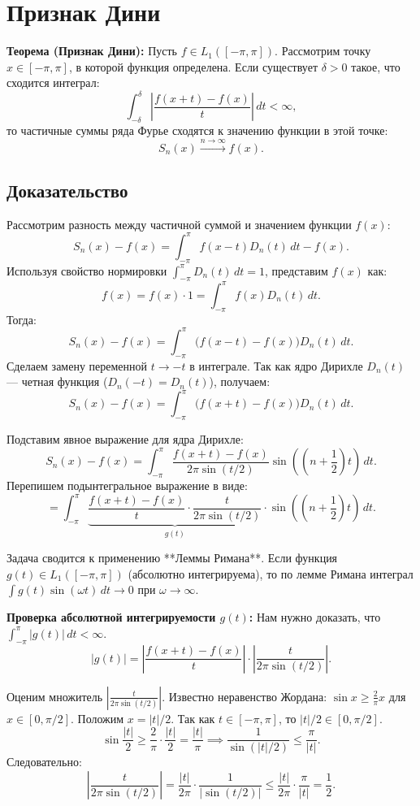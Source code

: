 \documentclass[12pt,a4paper,openany]{book}
\begin{document}
\section{Признак Дини}

\textbf{Теорема (Признак Дини):}
Пусть $f \in L_1([-\pi, \pi])$.
Рассмотрим точку $x \in [-\pi, \pi]$, в которой функция определена.
Если существует $\delta > 0$ такое, что сходится интеграл:
$$ \int_{-\delta}^{\delta} \left| \frac{f(x+t) - f(x)}{t} \right| \, dt < \infty, $$
то частичные суммы ряда Фурье сходятся к значению функции в этой точке:
$$ S_n(x) \xrightarrow{n \to \infty} f(x). $$

\subsection{Доказательство}

Рассмотрим разность между частичной суммой и значением функции $f(x)$:
$$ S_n(x) - f(x) = \int_{-\pi}^{\pi} f(x-t) D_n(t) \, dt - f(x). $$
Используя свойство нормировки $\int_{-\pi}^{\pi} D_n(t) \, dt = 1$, представим $f(x)$ как:
$$ f(x) = f(x) \cdot 1 = \int_{-\pi}^{\pi} f(x) D_n(t) \, dt. $$
Тогда:
$$ S_n(x) - f(x) = \int_{-\pi}^{\pi} \big( f(x-t) - f(x) \big) D_n(t) \, dt. $$
Сделаем замену переменной $t \to -t$ в интеграле. Так как ядро Дирихле $D_n(t)$ — четная функция ($D_n(-t) = D_n(t)$), получаем:
$$ S_n(x) - f(x) = \int_{-\pi}^{\pi} \big( f(x+t) - f(x) \big) D_n(t) \, dt. $$

Подставим явное выражение для ядра Дирихле:
$$ S_n(x) - f(x) = \int_{-\pi}^{\pi} \frac{f(x+t) - f(x)}{2\pi \sin(t/2)} \sin\left(\left(n + \frac{1}{2}\right)t\right) \, dt. $$
Перепишем подынтегральное выражение в виде:
$$ = \int_{-\pi}^{\pi} \underbrace{\frac{f(x+t) - f(x)}{t} \cdot \frac{t}{2\pi \sin(t/2)}}_{g(t)} \cdot \sin\left(\left(n + \frac{1}{2}\right)t\right) \, dt. $$

Задача сводится к применению **Леммы Римана**. Если функция $g(t) \in L_1([-\pi, \pi])$ (абсолютно интегрируема), то по лемме Римана интеграл $\int g(t) \sin(\omega t) \, dt \to 0$ при $\omega \to \infty$.

\textbf{Проверка абсолютной интегрируемости $g(t)$:}
Нам нужно доказать, что $\int_{-\pi}^{\pi} |g(t)| \, dt < \infty$.
$$ |g(t)| = \left| \frac{f(x+t) - f(x)}{t} \right| \cdot \left| \frac{t}{2\pi \sin(t/2)} \right|. $$

Оценим множитель $\left| \frac{t}{2\pi \sin(t/2)} \right|$.
Известно неравенство Жордана: $\sin x \ge \frac{2}{\pi}x$ для $x \in [0, \pi/2]$.
Положим $x = |t|/2$. Так как $t \in [-\pi, \pi]$, то $|t|/2 \in [0, \pi/2]$.
$$ \sin\frac{|t|}{2} \ge \frac{2}{\pi} \cdot \frac{|t|}{2} = \frac{|t|}{\pi} \implies \frac{1}{\sin(|t|/2)} \le \frac{\pi}{|t|}. $$
Следовательно:
$$ \left| \frac{t}{2\pi \sin(t/2)} \right| = \frac{|t|}{2\pi} \cdot \frac{1}{|\sin(t/2)|} \le \frac{|t|}{2\pi} \cdot \frac{\pi}{|t|} = \frac{1}{2}. $$
\end{document}
